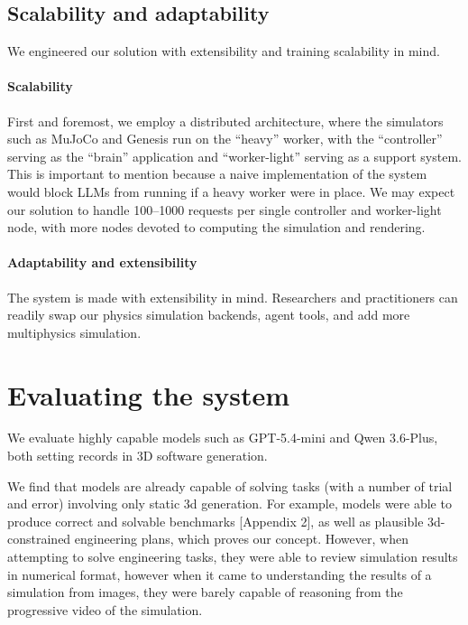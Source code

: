 \documentclass[conference]{IEEEtran}
\begin{document}
\subsection{Scalability and adaptability}
We engineered our solution with extensibility and training scalability in mind.

\paragraph{Scalability}
First and foremost, we employ a distributed architecture, where the simulators such as MuJoCo and Genesis run on the ``heavy'' worker, with the ``controller'' serving as the ``brain'' application and ``worker-light'' serving as a support system. This is important to mention because a naive implementation of the system would block LLMs from running if a heavy worker were in place. We may expect our solution to handle 100--1000 requests per single controller and worker-light node, with more nodes devoted to computing the simulation and rendering.

\paragraph{Adaptability and extensibility}
The system is made with extensibility in mind. Researchers and practitioners can readily swap our physics simulation backends, agent tools, and add more multiphysics simulation.

\section{Evaluating the system}

We evaluate highly capable models such as GPT-5.4-mini and Qwen 3.6-Plus, both setting records in 3D software generation.

We find that models are already capable of solving tasks (with a number of trial and error) involving only static 3d generation. For example, models were able to produce correct and solvable benchmarks [Appendix 2], as well as plausible 3d-constrained engineering plans, which proves our concept. However, when attempting to solve engineering tasks, they were able to review simulation results in numerical format, however when it came to understanding the results of a simulation from images, they were barely capable of reasoning from the progressive video of the simulation.
\end{document}
